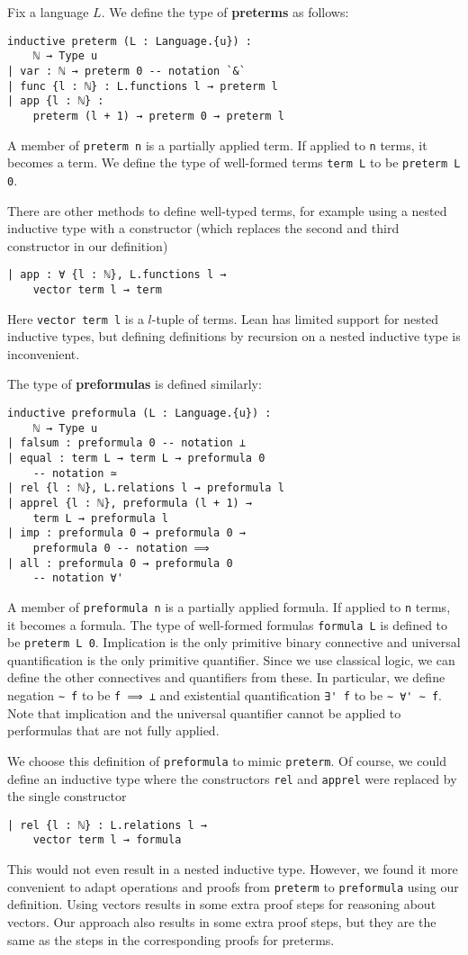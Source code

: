 \documentclass[sigplan,10pt,review, autoref,anonymous]{acmart}
\newcommand{\lil}{\lstinline}
\theoremstyle{definition}
\begin{document}
Fix a language $L$. We define the type of \textbf{preterms} as follows:
\begin{lstlisting}
inductive preterm (L : Language.{u}) :
    ℕ → Type u
| var : ℕ → preterm 0 -- notation `&`
| func {l : ℕ} : L.functions l → preterm l
| app {l : ℕ} :
    preterm (l + 1) → preterm 0 → preterm l
\end{lstlisting}
A member of \lil{preterm n} is a partially applied term.
If applied to \lil{n} terms, it becomes a term.
We define the type of well-formed terms \lil{term L} to be \lil{preterm L 0}.

There are other methods to define well-typed terms, for example using a nested inductive type with a constructor (which replaces the second and third constructor in our definition)
\begin{lstlisting}
| app : ∀ {l : ℕ}, L.functions l →
    vector term l → term
\end{lstlisting}
Here \lil{vector term l} is a $l$-tuple of terms.
Lean has limited support for nested inductive types, but defining definitions by recursion on a nested inductive type is inconvenient.

The type of \textbf{preformulas} is defined similarly:
\begin{lstlisting}
inductive preformula (L : Language.{u}) :
    ℕ → Type u
| falsum : preformula 0 -- notation ⊥
| equal : term L → term L → preformula 0
    -- notation ≃
| rel {l : ℕ}, L.relations l → preformula l
| apprel {l : ℕ}, preformula (l + 1) →
    term L → preformula l
| imp : preformula 0 → preformula 0 →
    preformula 0 -- notation ⟹
| all : preformula 0 → preformula 0
    -- notation ∀'
\end{lstlisting}
A member of \lil{preformula n} is a partially applied formula.
If applied to \lil{n} terms, it becomes a formula.
The type of well-formed formulas \lil{formula L} is defined to be \lil{preterm L 0}.
Implication is the only primitive binary connective and universal quantification is the only primitive quantifier. Since we use classical logic, we can define the other connectives and quantifiers from these.
In particular, we define negation \lil{∼ f} to be \lil{f ⟹ ⊥} and existential quantification \lil{∃' f} to be \lil{∼ ∀' ∼ f}.
Note that implication and the universal quantifier cannot be applied to performulas that are not fully applied.

We choose this definition of \lil{preformula} to mimic \lil{preterm}.
Of course, we could define an inductive type where the constructors \lil{rel} and \lil{apprel} were replaced by the single constructor
\begin{lstlisting}
| rel {l : ℕ} : L.relations l →
    vector term l → formula
\end{lstlisting}
This would not even result in a nested inductive type.
However, we found it more convenient to adapt operations and proofs from \lil{preterm} to \lil{preformula} using our definition.
Using vectors results in some extra proof steps for reasoning about vectors.
Our approach also results in some extra proof steps, but they are the same as the steps in the corresponding proofs for preterms.
\end{document}
